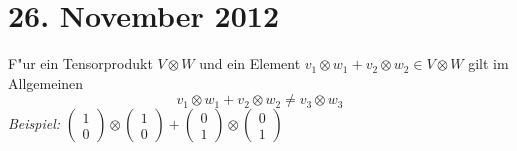 
\section{26. November 2012}
\setcounter{Aufg}{0} %
\setcounter{Loes}{0}

\begin{emptythm}[Einschub]
F"ur ein Tensorprodukt $V \otimes W$ und ein Element $v_1 \otimes w_1 + v_2 \otimes w_2 \in V \otimes W$ gilt im Allgemeinen
	\[v_1 \otimes w_1 + v_2 \otimes w_2 \ne v_3 \otimes w_3 \]
\emph{Beispiel:} $\left( \begin{smallmatrix} 1 \\ 0 \end{smallmatrix} \right) \otimes \left( \begin{smallmatrix} 1 \\ 0 \end{smallmatrix} \right) + \left( \begin{smallmatrix} 0 \\ 1 \end{smallmatrix} \right) \otimes \left( \begin{smallmatrix} 0 \\ 1 \end{smallmatrix} \right)$
\end{emptythm}

